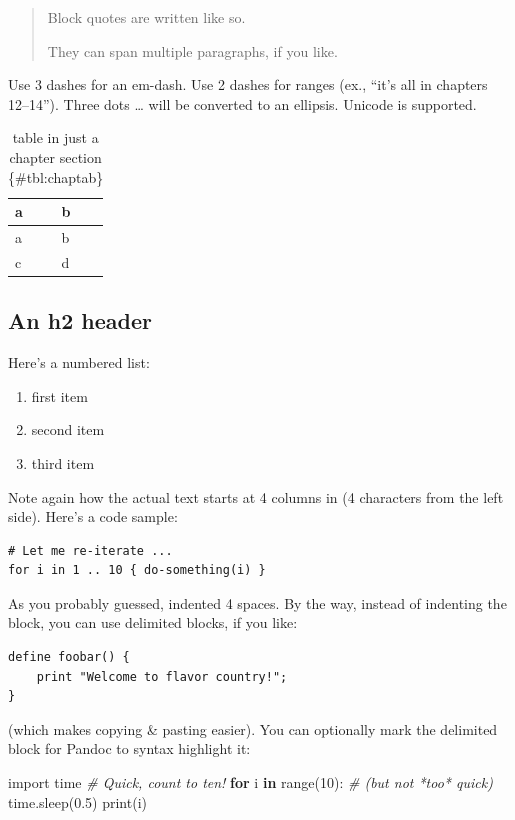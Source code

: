 \documentclass[
]{tufte-pandoc}
\newenvironment{Shaded}{}{}
\newcommand{\BuiltInTok}[1]{#1}
\newcommand{\CommentTok}[1]{\textcolor[rgb]{0.38,0.63,0.69}{\textit{#1}}}
\newcommand{\ControlFlowTok}[1]{\textcolor[rgb]{0.00,0.44,0.13}{\textbf{#1}}}
\newcommand{\DecValTok}[1]{\textcolor[rgb]{0.25,0.63,0.44}{#1}}
\newcommand{\FloatTok}[1]{\textcolor[rgb]{0.25,0.63,0.44}{#1}}
\newcommand{\ImportTok}[1]{#1}
\newcommand{\KeywordTok}[1]{\textcolor[rgb]{0.00,0.44,0.13}{\textbf{#1}}}
\newcommand{\NormalTok}[1]{#1}
\providecommand{\tightlist}{%
  \setlength{\itemsep}{0pt}\setlength{\parskip}{0pt}}
\begin{document}
\begin{quote}
Block quotes are written like so.

They can span multiple paragraphs, if you like.
\end{quote}

Use 3 dashes for an em-dash. Use 2 dashes for ranges (ex., ``it's all in
chapters 12--14''). Three dots \ldots{} will be converted to an
ellipsis. Unicode is supported.

\begin{longtable}[]{@{}ll@{}}
\caption{table in just a chapter section
\{\#tbl:chaptab\}}\tabularnewline
\toprule()
a & b \\
\midrule()
\endfirsthead
\toprule()
a & b \\
\midrule()
\endhead
c & d \\
\bottomrule()
\end{longtable}

\hypertarget{an-h2-header}{%
\subsection{An h2 header}\label{an-h2-header}}

Here's a numbered list:

\begin{enumerate}
\def\labelenumi{\arabic{enumi}.}
\tightlist
\item
  first item
\item
  second item
\item
  third item
\end{enumerate}

Note again how the actual text starts at 4 columns in (4 characters from
the left side). Here's a code sample:

\begin{verbatim}
# Let me re-iterate ...
for i in 1 .. 10 { do-something(i) }
\end{verbatim}

As you probably guessed, indented 4 spaces. By the way, instead of
indenting the block, you can use delimited blocks, if you like:

\begin{verbatim}
define foobar() {
    print "Welcome to flavor country!";
}
\end{verbatim}

(which makes copying \& pasting easier). You can optionally mark the
delimited block for Pandoc to syntax highlight it:

\begin{Shaded}
\begin{Highlighting}[]
\ImportTok{import}\NormalTok{ time}
\CommentTok{\# Quick, count to ten!}
\ControlFlowTok{for}\NormalTok{ i }\KeywordTok{in} \BuiltInTok{range}\NormalTok{(}\DecValTok{10}\NormalTok{):}
    \CommentTok{\# (but not *too* quick)}
\NormalTok{    time.sleep(}\FloatTok{0.5}\NormalTok{)}
    \BuiltInTok{print}\NormalTok{(i)}
\end{Highlighting}
\end{Shaded}
\end{document}
